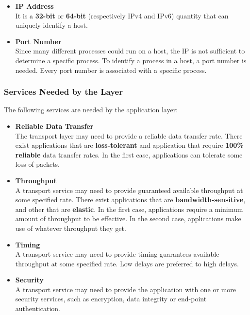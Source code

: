 \documentclass{article}
\begin{document}
\begin{itemize}
	\item \textbf{IP Address}
	\vspace{.2cm} \\
	It is a \textbf{32-bit} or \textbf{64-bit} (respectively IPv4 and IPv6) quantity that can uniquely identify a host.
	
	\item \textbf{Port Number}
	\vspace{.2cm} \\
	Since many different processes could run on a host, the IP is not sufficient to determine a specific process. To identify a process in a host, a port number is needed. Every port number is associated with a specific process.
\end{itemize}

\subsubsection{Services Needed by the Layer}
The following services are needed by the application layer:

\begin{itemize}
	\item \textbf{Reliable Data Transfer}
	\vspace{.2cm} \\
	The transport layer may need to provide a reliable data transfer rate. There exist applications that are \textbf{loss-tolerant} and application that require \textbf{100\% reliable} data transfer rates. In the first case, applications can tolerate some loss of packets.
	
	\item \textbf{Throughput}
	\vspace{.2cm} \\
	A transport service may need to provide guaranteed available throughput at some specified rate. There exist applications that are \textbf{bandwidth-sensitive}, and other that are \textbf{elastic}. In the first case, applications require a minimum amount of throughput to be effective. In the second case, applications make use of whatever throughput they get.
	
	\item \textbf{Timing}
	\vspace{.2cm} \\
	A transport service may need to provide timing guarantees available throughput at some specified rate. Low delays are preferred to high delays.
	
	\item \textbf{Security}
	\vspace{.2cm} \\
	A transport service may need to provide the application with one or more security services, such as encryption, data integrity or end-point authentication.
\end{itemize}
\end{document}
